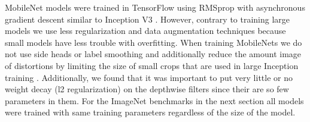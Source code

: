 \documentclass[10pt,twocolumn,letterpaper]{article}
\begin{document}
MobileNet models were trained in TensorFlow \cite{abadi2015tensorflow} using RMSprop \cite{tieleman2012lecture} with asynchronous gradient descent similar to Inception V3 \cite{szegedy2015rethinking}. However, contrary to training large models we use less regularization and data augmentation techniques because small models have less trouble with overfitting. When training MobileNets we do not use side heads or label smoothing and additionally reduce the amount image of distortions by limiting the size of small crops that are used in large Inception training \cite{szegedy2015rethinking}. Additionally, we found that it was important to put very little or no weight decay (l2 regularization) on the depthwise filters since their are so few parameters in them. For the ImageNet benchmarks in the next section all models were trained with same training parameters regardless of the size of the model.  
\end{document}
